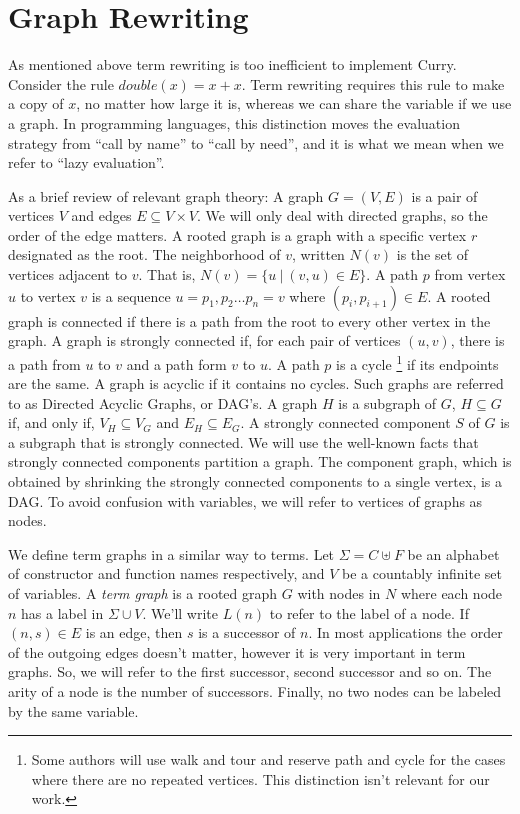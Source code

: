 \documentclass{book}
\theoremstyle{definition}
\begin{document}
\section{Graph Rewriting}
As mentioned above term rewriting is too inefficient to implement Curry.
Consider the rule $double(x) = x + x$.
Term rewriting requires this rule to make a copy of $x$, no matter how large it is,
whereas we can share the variable if we use a graph.
In programming languages, this distinction moves the evaluation strategy from
``call by name'' to ``call by need'', and it is what we mean when we refer to ``lazy evaluation''.


As a brief review of relevant graph theory:
A graph $G = (V,E)$ is a pair of vertices $V$ and edges $E \subseteq V \times V$.
We will only deal with directed graphs, so the order of the edge matters.
A rooted graph is a graph with a specific vertex $r$ designated as the root.
The neighborhood of $v$, written $N(v)$ is the set of vertices adjacent to $v$.
That is, $N(v) = \{u\ \vert\ (v,u) \in E\}$.
A path $p$ from vertex $u$ to vertex $v$ is a sequence 
$u = p_1, p_2 \ldots p_n = v$ where $(p_i,p_{i+1}) \in E$.
A rooted graph is connected if there is a path from the root to every other vertex in the graph.
A graph is strongly connected if, for each pair of vertices $(u,v)$, there is a path from $u$ to $v$
and a path form $v$ to $u$.
A path $p$ is a cycle
\footnote{Some authors will use walk and tour and
reserve path and cycle for the cases where there are no repeated vertices.
This distinction isn't relevant for our work.}
if its endpoints are the same.
A graph is acyclic if it contains no cycles.
Such graphs are referred to as Directed Acyclic Graphs, or DAG's.
A graph $H$ is a subgraph of $G$, $H \subseteq G$ if, and only if, $V_H \subseteq V_G$
and $E_H \subseteq E_G$.
A strongly connected component $S$ of $G$ is a subgraph that is strongly connected.
We will use the well-known facts that strongly connected components partition a graph.
The component graph, which is obtained by shrinking the strongly connected components 
to a single vertex, is a DAG.
To avoid confusion with variables, we will refer to vertices of graphs as nodes.


We define term graphs in a similar way to terms.
Let $\Sigma = C \uplus F$ be an alphabet of constructor and function names respectively,
and $V$ be a countably infinite set of variables.
A \textit{term graph} is a rooted graph $G$ with nodes in
$N$ where each node $n$ has a label in $\Sigma \cup V$.
We'll write $L(n)$ to refer to the label of a node.
If $(n, s) \in E$ is an edge, then $s$ is a successor of $n$.
In most applications the order of the outgoing edges doesn't matter, 
however it is very important in term graphs.
So, we will refer to the first successor, second successor and so on.
The arity of a node is the number of successors.
Finally, no two nodes can be labeled by the same variable.
\end{document}
